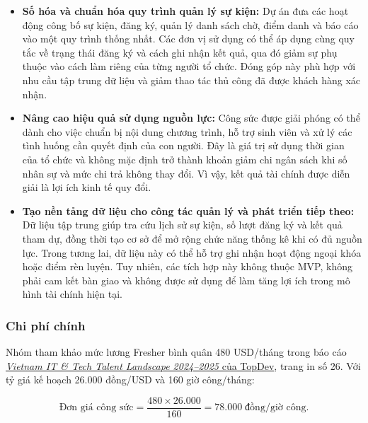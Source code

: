 \begin{itemize}
    \item \textbf{Số hóa và chuẩn hóa quy trình quản lý sự kiện:} Dự án đưa các hoạt động công bố sự kiện, đăng ký, quản lý danh sách chờ, điểm danh và báo cáo vào một quy trình thống nhất. Các đơn vị sử dụng có thể áp dụng cùng quy tắc về trạng thái đăng ký và cách ghi nhận kết quả, qua đó giảm sự phụ thuộc vào cách làm riêng của từng người tổ chức. Đóng góp này phù hợp với nhu cầu tập trung dữ liệu và giảm thao tác thủ công đã được khách hàng xác nhận.

    \item \textbf{Nâng cao hiệu quả sử dụng nguồn lực:} Công sức được giải phóng có thể dành cho việc chuẩn bị nội dung chương trình, hỗ trợ sinh viên và xử lý các tình huống cần quyết định của con người. Đây là giá trị sử dụng thời gian của tổ chức và không mặc định trở thành khoản giảm chi ngân sách khi số nhân sự và mức chi trả không thay đổi. Vì vậy, kết quả tài chính được diễn giải là lợi ích kinh tế quy đổi.

    \item \textbf{Tạo nền tảng dữ liệu cho công tác quản lý và phát triển tiếp theo:} Dữ liệu tập trung giúp tra cứu lịch sử sự kiện, số lượt đăng ký và kết quả tham dự, đồng thời tạo cơ sở để mở rộng chức năng thống kê khi có đủ nguồn lực. Trong tương lai, dữ liệu này có thể hỗ trợ ghi nhận hoạt động ngoại khóa hoặc điểm rèn luyện. Tuy nhiên, các tích hợp này không thuộc MVP, không phải cam kết bàn giao và không được sử dụng để làm tăng lợi ích trong mô hình tài chính hiện tại.
\end{itemize}

\subsubsection{Chi phí chính}


Nhóm tham khảo mức lương Fresher bình quân 480 USD/tháng trong báo cáo \href{https://employerbranding.vn/wp-content/uploads/2025/01/VIETNAM-IT-TECH-TALENT-LANDSCAPE-2024-2025.pdf}{\textit{Vietnam IT \& Tech Talent Landscape 2024--2025} của TopDev}, trang in số 26. Với tỷ giá kế hoạch 26.000 đồng/USD và 160 giờ công/tháng:

\begin{equation*}
    \text{Đơn giá công sức} = \frac{480 \times 26.000}{160} = 78.000\;\text{đồng/giờ công}.
\end{equation*}


